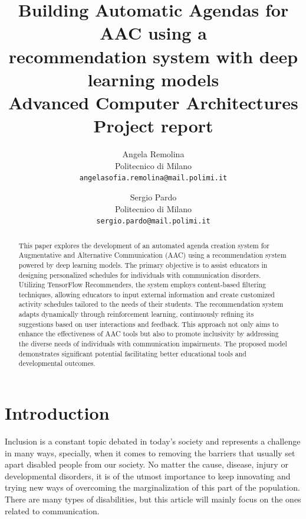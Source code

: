 \documentclass[10pt,twocolumn,letterpaper]{article}
\begin{document}
\title{%
  Building Automatic Agendas for AAC using a\\ 
    recommendation system with deep learning models  \\
    [3ex]
  \large Advanced Computer Architectures Project report
}
  
\author{
Angela Remolina\\
Politecnico di Milano\\
{\tt\small angelasofia.remolina@mail.polimi.it}
\and
Sergio Pardo\\
Politecnico di Milano\\
{\tt\small sergio.pardo@mail.polimi.it}
}

\maketitle

\begin{abstract}
This paper explores the development of an automated agenda creation system for Augmentative and Alternative Communication (AAC) using a recommendation system powered by deep learning models. The primary objective is to assist educators in designing personalized schedules for individuals with communication disorders. Utilizing TensorFlow Recommenders, the system employs content-based filtering techniques, allowing educators to input external information and create customized activity schedules tailored to the needs of their students. The recommendation system adapts dynamically through reinforcement learning, continuously refining its suggestions based on user interactions and feedback. This approach not only aims to enhance the effectiveness of AAC tools but also to promote inclusivity by addressing the diverse needs of individuals with communication impairments. The proposed model demonstrates significant potential facilitating better educational tools and developmental outcomes.

\end{abstract}

\section{Introduction}
Inclusion is a constant topic debated in today's society and represents a challenge in many ways, specially, when it comes to removing the barriers that usually set apart disabled people from our society. No matter the cause, disease, injury or developmental disorders, it is of the utmost importance to keep innovating and trying new ways of overcoming the marginalization of this part of the population. There are many types of disabilities, but this article will mainly focus on the ones related to communication. \\
\end{document}
